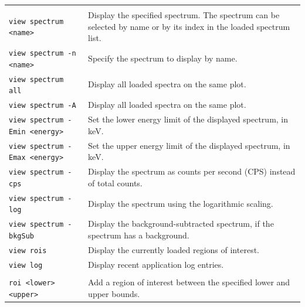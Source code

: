 \begin{longtable}{>{\ttfamily}p{} p{}}
    \multicolumn{2}{l}{\textbf{Viewing Data}} \\

    \texttt{view spectrum <name>} &
        Display the specified spectrum. The spectrum can be selected by name
        or by its index in the loaded spectrum list. \\

    \texttt{view spectrum -n <name>} &
        Specify the spectrum to display by name. \\

    \texttt{view spectrum all} &
        Display all loaded spectra on the same plot. \\

    \texttt{view spectrum -A} &
        Display all loaded spectra on the same plot. \\

    \texttt{view spectrum -Emin <energy>} &
        Set the lower energy limit of the displayed spectrum, in keV. \\

    \texttt{view spectrum -Emax <energy>} &
        Set the upper energy limit of the displayed spectrum, in keV. \\

    \texttt{view spectrum -cps} &
        Display the spectrum as counts per second (CPS) instead of total
        counts. \\

    \texttt{view spectrum -log} &
        Display the spectrum using the logarithmic scaling. \\

    \texttt{view spectrum -bkgSub} &
        Display the background-subtracted spectrum, if the spectrum has a background. \\

    \texttt{view rois} &
        Display the currently loaded regions of interest. \\

    \texttt{view log} &
        Display recent application log entries. \\

    \hline


    \multicolumn{2}{l}{\textbf{ROI Management}} \\

    \texttt{roi <lower> <upper>} &
        Add a region of interest between the specified lower and upper
        bounds. \\


\end{longtable}
